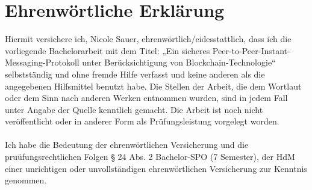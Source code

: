 \chapter*{Ehrenwörtliche Erklärung}

Hiermit versichere ich, Nicole Sauer, ehrenwörtlich/eidesstattlich, dass ich die vorliegende Bachelorarbeit 
mit dem Titel: „Ein sicheres Peer-to-Peer-Instant-Messaging-Protokoll unter Berücksichtigung von 
Blockchain-Technologie“ selbstständig und ohne fremde Hilfe verfasst und keine anderen als die 
angegebenen Hilfsmittel benutzt habe. Die Stellen der Arbeit, die dem Wortlaut oder dem Sinn nach 
anderen Werken entnommen wurden, sind in jedem Fall unter Angabe der Quelle kenntlich gemacht. 
Die Arbeit ist noch nicht veröffentlicht oder in anderer Form als Prüfungsleistung vorgelegt worden. \\
\\
Ich habe die Bedeutung der ehrenwörtlichen Versicherung und die pruüfungsrechtlichen Folgen 
§ 24 Abs. 2 Bachelor-SPO (7 Semester), der HdM einer unrichtigen oder unvollständigen 
ehrenwörtlichen Versicherung zur Kenntnis genommen.
